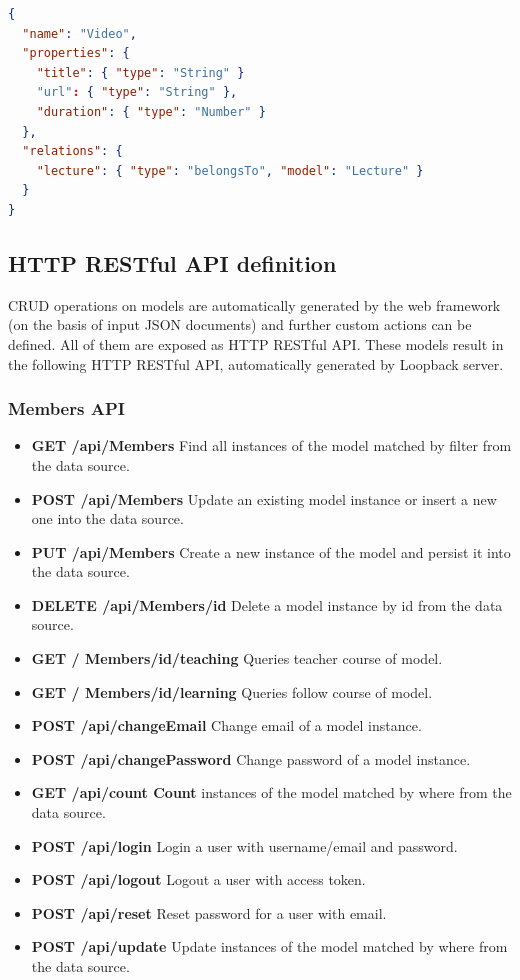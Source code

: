 \begin{lstlisting}[language=json]
{
  "name": "Video",
  "properties": {
    "title": { "type": "String" }
    "url": { "type": "String" },
    "duration": { "type": "Number" }
  },
  "relations": {
    "lecture": { "type": "belongsTo", "model": "Lecture" }
  }
}

\end{lstlisting}


\subsection {HTTP RESTful API definition}
\label{subsec:HTTP_RESTful_API_definition}

CRUD operations on models are automatically generated by the web framework (on the basis of input JSON documents) and further custom actions can be defined. All of them are exposed as HTTP RESTful API.
These models result in the following HTTP RESTful API, automatically generated by Loopback server.

\subsubsection{ Members API}
\begin{itemize}
\item \textbf{GET /api/Members} Find all instances of the model matched by filter from  the  data source.
\item \textbf{POST /api/Members} Update an existing model instance or insert a new one into the data  source.
\item \textbf{PUT /api/Members} Create a new instance of the model and persist it into the data source.
\item \textbf{DELETE /api/Members/id} Delete a model instance by id from the data source.
\item \textbf{GET / Members/id/teaching} {\color{red}Queries teacher course of model.}

\item \textbf{GET / Members/id/learning} {\color{red} Queries follow course of model.}

\item \textbf{POST /api/changeEmail} Change email of a model instance.
\item \textbf{POST /api/changePassword} Change password of a model instance.
\item \textbf{GET /api/count Count} instances of the model matched by where from the  data source.
\item \textbf{POST /api/login} Login a user with username/email and password.
\item \textbf{POST /api/logout} Logout a user with access   token.
\item \textbf{POST /api/reset} Reset password for a user with email.
\item \textbf{POST /api/update} Update instances of the model matched by where from the data source.
\end{itemize}

